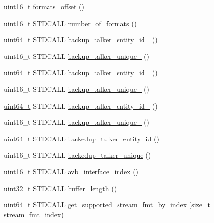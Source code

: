 \begin{DoxyCompactItemize}
uint16\+\_\+t \hyperlink{classavdecc__lib_1_1stream__input__descriptor__response__imp_a7035090487c372efc97d56ad77148cfc}{formats\+\_\+offset} ()
\item 
uint16\+\_\+t S\+T\+D\+C\+A\+LL \hyperlink{classavdecc__lib_1_1stream__input__descriptor__response__imp_a159e8e8c593b548faf249fc404afa7e3}{number\+\_\+of\+\_\+formats} ()
\item 
\hyperlink{parse_8c_aec6fcb673ff035718c238c8c9d544c47}{uint64\+\_\+t} S\+T\+D\+C\+A\+LL \hyperlink{classavdecc__lib_1_1stream__input__descriptor__response__imp_a7069339e1e712c1ffb3f7627c6e731fc}{backup\+\_\+talker\+\_\+entity\+\_\+id\+\_} ()
\item 
uint16\+\_\+t S\+T\+D\+C\+A\+LL \hyperlink{classavdecc__lib_1_1stream__input__descriptor__response__imp_a0d5775425dd9b5b953299e00f4554e31}{backup\+\_\+talker\+\_\+unique\+\_} ()
\item 
\hyperlink{parse_8c_aec6fcb673ff035718c238c8c9d544c47}{uint64\+\_\+t} S\+T\+D\+C\+A\+LL \hyperlink{classavdecc__lib_1_1stream__input__descriptor__response__imp_ab15c1e07ce662d441f84bbf57448ce32}{backup\+\_\+talker\+\_\+entity\+\_\+id\+\_} ()
\item 
uint16\+\_\+t S\+T\+D\+C\+A\+LL \hyperlink{classavdecc__lib_1_1stream__input__descriptor__response__imp_ae7be6e3982ff7244a985c99688af1cc8}{backup\+\_\+talker\+\_\+unique\+\_} ()
\item 
\hyperlink{parse_8c_aec6fcb673ff035718c238c8c9d544c47}{uint64\+\_\+t} S\+T\+D\+C\+A\+LL \hyperlink{classavdecc__lib_1_1stream__input__descriptor__response__imp_a68f720a7cb3cad6ea7a9fe5611d1d1b3}{backup\+\_\+talker\+\_\+entity\+\_\+id\+\_} ()
\item 
uint16\+\_\+t S\+T\+D\+C\+A\+LL \hyperlink{classavdecc__lib_1_1stream__input__descriptor__response__imp_ad7ef80dad6b6116492b964c9e694e8c4}{backup\+\_\+talker\+\_\+unique\+\_} ()
\item 
\hyperlink{parse_8c_aec6fcb673ff035718c238c8c9d544c47}{uint64\+\_\+t} S\+T\+D\+C\+A\+LL \hyperlink{classavdecc__lib_1_1stream__input__descriptor__response__imp_a1a355b30bce8e2eda6f2cc774290c00d}{backedup\+\_\+talker\+\_\+entity\+\_\+id} ()
\item 
uint16\+\_\+t S\+T\+D\+C\+A\+LL \hyperlink{classavdecc__lib_1_1stream__input__descriptor__response__imp_a8e27a809269c66079498002b98a1f492}{backedup\+\_\+talker\+\_\+unique} ()
\item 
uint16\+\_\+t S\+T\+D\+C\+A\+LL \hyperlink{classavdecc__lib_1_1stream__input__descriptor__response__imp_ae7d22ba1a477c0d8f54d85404b2e4d08}{avb\+\_\+interface\+\_\+index} ()
\item 
\hyperlink{parse_8c_a6eb1e68cc391dd753bc8ce896dbb8315}{uint32\+\_\+t} S\+T\+D\+C\+A\+LL \hyperlink{classavdecc__lib_1_1stream__input__descriptor__response__imp_a40149b8c489bce1cc06d3411fa6619d2}{buffer\+\_\+length} ()
\item 
\hyperlink{parse_8c_aec6fcb673ff035718c238c8c9d544c47}{uint64\+\_\+t} S\+T\+D\+C\+A\+LL \hyperlink{classavdecc__lib_1_1stream__input__descriptor__response__imp_a78bde361afa9769b9edd018346d6e8e0}{get\+\_\+supported\+\_\+stream\+\_\+fmt\+\_\+by\+\_\+index} (size\+\_\+t stream\+\_\+fmt\+\_\+index)
\end{DoxyCompactItemize}
